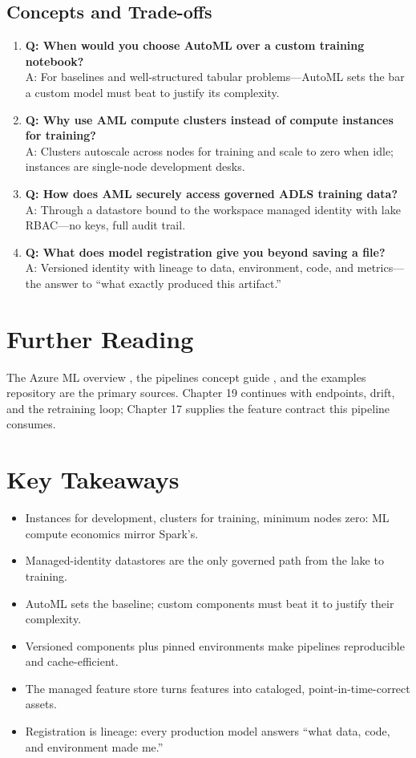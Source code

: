 \subsection{Concepts and Trade-offs}
\begin{enumerate}
    \item \textbf{Q: When would you choose AutoML over a custom training notebook?}\\
    A: For baselines and well-structured tabular problems---AutoML sets the bar a custom model must beat to justify its complexity.
    \item \textbf{Q: Why use AML compute clusters instead of compute instances for training?}\\
    A: Clusters autoscale across nodes for training and scale to zero when idle; instances are single-node development desks.
    \item \textbf{Q: How does AML securely access governed ADLS training data?}\\
    A: Through a datastore bound to the workspace managed identity with lake RBAC---no keys, full audit trail.
    \item \textbf{Q: What does model registration give you beyond saving a file?}\\
    A: Versioned identity with lineage to data, environment, code, and metrics---the answer to ``what exactly produced this artifact.''
\end{enumerate}

\section{Further Reading}
The Azure ML overview \cite{microsoft2025azureml}, the pipelines concept guide \cite{microsoft2025amlPipelines}, and the examples repository \cite{microsoft2025azuremlExamples} are the primary sources. Chapter 19 continues with endpoints, drift, and the retraining loop; Chapter 17 supplies the feature contract this pipeline consumes.

\section*{Key Takeaways}
\begin{itemize}
    \item Instances for development, clusters for training, minimum nodes zero: ML compute economics mirror Spark's.
    \item Managed-identity datastores are the only governed path from the lake to training.
    \item AutoML sets the baseline; custom components must beat it to justify their complexity.
    \item Versioned components plus pinned environments make pipelines reproducible and cache-efficient.
    \item The managed feature store turns features into cataloged, point-in-time-correct assets.
    \item Registration is lineage: every production model answers ``what data, code, and environment made me.''
\end{itemize}

